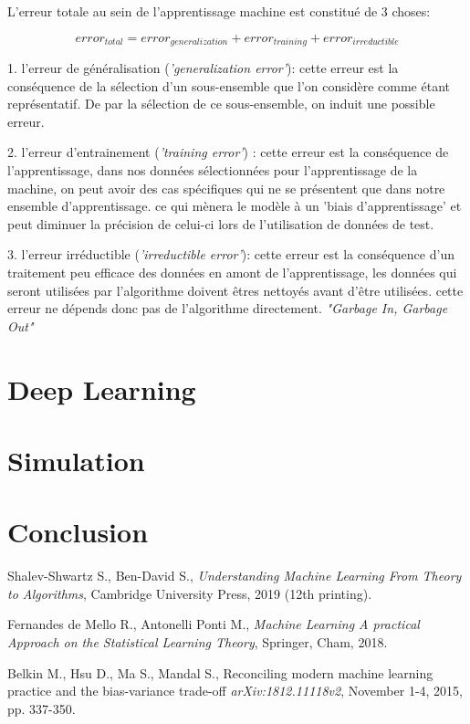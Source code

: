 \documentclass[a4paper]{article}
\begin{document}
\newpage

L'erreur totale au sein de l'apprentissage machine est constitué de 3 choses: \newline

\[ error_{total} = error_{generalization} + error_{training} + error_{irreductible} \]

1. l'erreur de généralisation (\textit{'generalization error'}): cette erreur est la conséquence de la sélection d'un sous-ensemble que l'on considère comme étant représentatif. De par la sélection de ce sous-ensemble, on induit une possible erreur.\newline

2. l'erreur d'entrainement (\textit{'training error'}) : cette erreur est la conséquence de l'apprentissage, dans nos données sélectionnées pour l'apprentissage de la machine, on peut avoir des cas spécifiques qui ne se présentent que dans notre ensemble d'apprentissage. ce qui mènera le modèle à un 'biais d'apprentissage' et peut diminuer la précision de celui-ci lors de l'utilisation de données de test.\newline

3. l'erreur irréductible (\textit{'irreductible error'}): cette erreur est la conséquence d'un traitement peu efficace des données en amont de l'apprentissage, les données qui seront utilisées par l'algorithme doivent êtres nettoyés avant d'être utilisées. cette erreur ne dépends donc pas de l'algorithme directement. \textit{"Garbage In, Garbage Out"}\newline
\newpage

\section{Deep Learning}

\newpage

\section{Simulation}

\newpage

\section{Conclusion}

\newpage

\begin{thebibliography}{9}
	
	Shalev-Shwartz S., Ben-David S.,
	\textit{Understanding Machine Learning From Theory to Algorithms},
	Cambridge University Press, 2019 (12th printing).
	
	Fernandes de Mello R., Antonelli Ponti M.,
	\textit{Machine Learning A practical Approach on the Statistical Learning Theory},
	Springer, Cham, 2018.
	
	Belkin M., Hsu D., Ma S., Mandal S.,
	Reconciling modern machine learning practice and the bias-variance trade-off
	\textit{arXiv:1812.11118v2}, November 1-4, 2015, pp. 337-350. 
	
	
\end{thebibliography}
\newpage

\listoffigures
\newpage
\end{document}
